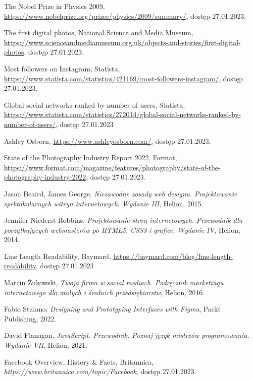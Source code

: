 \documentclass[a4paper, 12pt, twoside]{article}
\numberwithin{figure}{section}
\begin{document}
\begin{sloppypar}
\begin{thebibliography}{99}
    The Nobel Prize in Physics 2009,
    \url{https://www.nobelprize.org/prizes/physics/2009/summary/}, 
    dostęp 27.01.2023.

    The first digital photos, National Science and Media Museum,
    \url{https://www.scienceandmediamuseum.org.uk/objects-and-stories/first-digital-photos},
    dostęp 27.01.2023.

    Most followers on Instagram, Statista,
    \url{https://www.statista.com/statistics/421169/most-followers-instagram/},
    dostęp 27.01.2023.

    Global social networks ranked by number of users, Statista,
    \url{https://www.statista.com/statistics/272014/global-social-networks-ranked-by-number-of-users/},
    dostęp 27.01.2023

    Ashley Osborn,
    \url{https://www.ashleyosborn.com/},
    dostęp 27.01.2023.

    State of the Photography Industry Report 2022, Format,
    \url{https://www.format.com/magazine/features/photography/state-of-the-photography-industry-2022},
    dostęp 27.01.2023.

    Jason Beaird, James George,
    \textit{Niezawodne zasady web designu. Projektowanie spektakularnych witryn internetowych. Wydanie III},
    Helion,
    2015.

    Jennifer Niederst Robbins,
    \textit{Projektowanie stron internetowych. Przewodnik dla początkujących webmasterów po HTML5, CSS3 i grafice. Wydanie IV},
    Helion,
    2014.

    Line Length Readability, Baymard,
    \url{https://baymard.com/blog/line-length-readability},
    dostęp 27.01.2023

    Marcin Żukowski,
    \textit{Twoja firma w social mediach. Podręcznik marketingu internetowego dla małych i średnich przedsiębiorstw},
    Helion,
    2016.

    Fabio Staiano,
    \textit{Designing and Prototyping Interfaces with Figma},
    Packt Publishing,
    2022.

    David Flanagan,
    \textit{JavaScript. Przewodnik. Poznaj język mistrzów programowania. Wydanie VII},
    Helion,
    2021.

    Facebook Overview, History \& Facts, Britannica,
    \textit{https://www.britannica.com/topic/Facebook},
    dostęp 27.01.2023.


\end{thebibliography}
\end{sloppypar}
\end{document}
